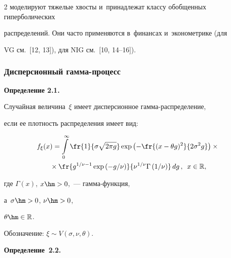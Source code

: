 \begin{multicols}{2}
моделируют тяжелые хвосты и~принадлежат классу обобщенных гиперболических 


распределений. Они часто применяются в~финансах и~эконометрике (для 


VG см.~[12,  13]), для NIG см.~[10, 14--16]).





\subsubsection {Дисперсионный гамма-процесс}





\noindent


\textbf{Определение 2.1.}\


Случайная величина~$\xi$ имеет дисперсионное гам\-ма-рас\-пре\-де\-ле\-ние, 


если ее плотность распределения имеет вид:


\begin{multline} \label{vgpdf}


 f_\xi(x) = \int\limits_{0}^{\infty} \fr{1}{\sigma  \sqrt{2 \pi g}} 


 \exp \left( - \fr{(x - \theta g)^2}{2 \sigma^2 g}  \right) \times{}\\


 {}\times


\fr{g ^{{1}/{\nu} - 1} \exp \left( - {g}/{\nu} \right)}


{\nu  ^{{1}/{\nu}} \Gamma \left({1}/{\nu}\right) }\, dg\,,\enskip x \in \mathbb{R},


                \end{multline}


                где $\Gamma (x)$, $x\hm>0$,~--- гам\-ма-функ\-ция, 


                а~$\sigma \hm> 0$, $\nu \hm> 0$,  


$\theta \hm\in \mathbb{R}$.








        Обозначение: $\xi \sim V(\sigma, \nu, \theta)$.





\smallskip





\noindent


\textbf{Определение~2.2.}\



\end{multicols}
